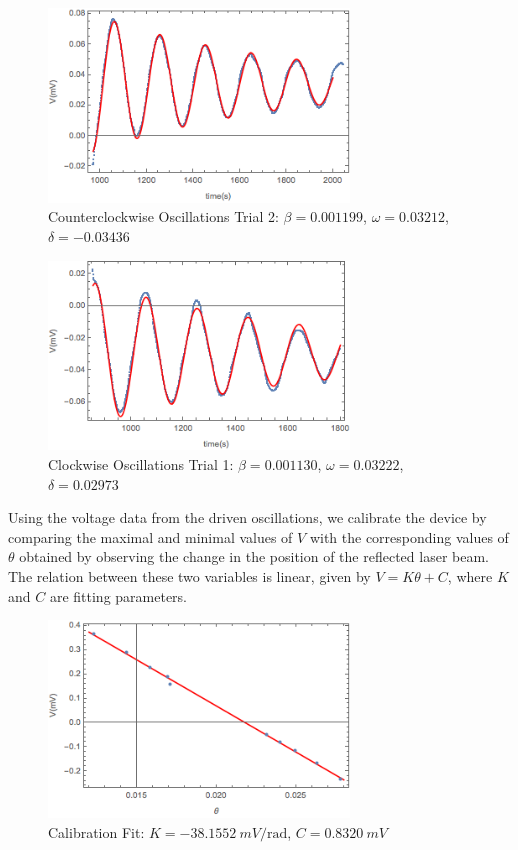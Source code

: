 \documentclass[aps, reprint,amsmath,amssymb]{revtex4-1} %
\begin{document}
\begin{figure}[b]
\centering
\includegraphics[width=8cm]{figs/counterclockwise2plot.png}
\caption{Counterclockwise Oscillations Trial 2: $\beta = 0.001199$, $\omega = 0.03212$, $\delta=-0.03436$}
\end{figure}

\begin{figure}
\centering
\includegraphics[width=8cm]{figs/clockwise1plot.png}
\caption{Clockwise Oscillations Trial 1: $\beta = 0.001130$, $\omega = 0.03222$, $\delta=0.02973$}
\end{figure}

Using the voltage data from the driven oscillations, we calibrate the
device by comparing the maximal and minimal values of $V$ with the
corresponding values of $\theta$ obtained by observing the change in the
position of the reflected laser beam. The relation between these two
variables is linear, given by $V = K \theta + C$, where $K$
and $C$ are fitting parameters.

\begin{figure}
\centering
\includegraphics[width=8cm]{figs/calibration.png}
\caption{Calibration Fit: $K=-\SI{38.1552}{mV \per \radian}$, $C=\SI{0.8320}{mV}$}
\end{figure} 
\end{document}
